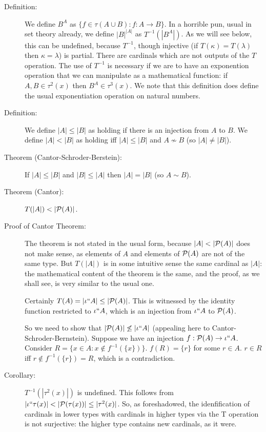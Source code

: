 \documentclass[12pt]{article}
\begin{document}
\begin{description}

\item[Definition:]  We define $B^A$ as $\{f \in \tau(A \cup B):f:A \rightarrow B\}$.  In a horrible pun, usual in set theory already, we define $|B|^{|A|}$ as $T^{-1}(|B^A|)$.  As we will see below, this can be undefined, because $T^{-1}$, though injective (if $T(\kappa) = T(\lambda)$ then $\kappa=\lambda$) is partial.  There are cardinals which are not outputs of the $T$ operation.  The use of $T^{-1}$ is necessary if we are to have an exponention operation that we can manipulate as a mathematical function:  if $A,B \in \tau^2(x)$ then
$B^A \in \tau^3(x)$.   We note that this definition does define the usual exponentiation operation on natural numbers.

\item[Definition:]  We define $|A|\leq |B|$ as holding if there is an injection from $A$ to $B$.  We define $|A|<|B|$ as holding iff $|A| \leq |B|$ and $A \not\sim B$ (so $|A| \neq |B|$).

\item[Theorem (Cantor-Schroder-Berstein):]  If $|A| \leq |B|$ and $|B| \leq |A|$ then $|A| = |B|$ (so $A \sim B$).

\item[Theorem (Cantor):]  $T(|A|) < |{\cal P}(A)|$.

\item[Proof of Cantor Theorem:]  The theorem is not stated in the usual form, because $|A| < |{\cal P}(A)|$ does not make sense, as elements of $A$
and elements of ${\cal P}(A)$ are not of the same type.  But $T(|A|)$ is in some intuitive sense the same cardinal as $|A|$:  the mathematical content of the theorem is the
same, and the proof, as we shall see, is very similar to the usual one.

Certainly $T(A) = |\iota``A| \leq |{\cal P}(A)|$.  This is witnessed by the identity function restricted to $\iota``A$, which is an injection from $\iota``A$ to ${\cal P}(A)$.

So we need to show that $|{\cal P}(A)| \not\leq |\iota``A|$ (appealing here to Cantor-Schroder-Bernstein).  Suppose we have an injection $f:{\cal P}(A) \rightarrow \iota``A$.
Consider $R = \{x \in A:x \not\in f^{-1}(\{x\})\}$.  $f(R) =\{r\}$ for some $r \in A$.  $r \in R$ iff $r \not\in f^{-1}(\{r\}) = R$, which is a contradiction.

\item[Corollary:]  $T^{-1}(|\tau^2(x)|)$ is undefined.  This follows from $|\iota``\tau(x)| < |{\cal P}(\tau(x))| \leq |\tau^2(x)|$.  So, as foreshadowed, the idenfification of cardinals in lower types with cardinals in higher types via the T operation is not surjective:  the higher type contains new cardinals, as it were.

\end{description}
\end{document}
